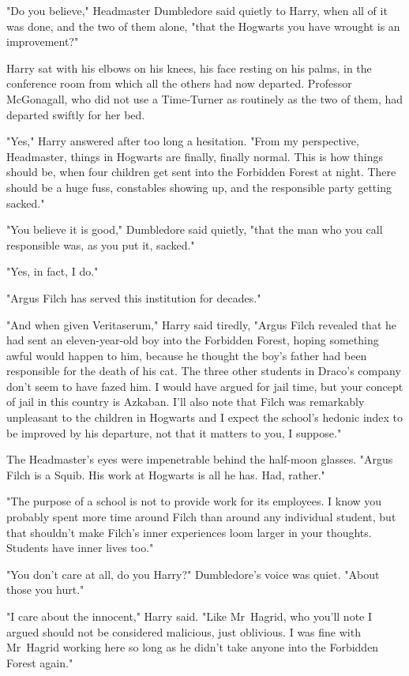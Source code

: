 "Do you believe," Headmaster Dumbledore said quietly to Harry, when all of it
was done, and the two of them alone, "that the Hogwarts you have wrought is an
improvement?"

Harry sat with his elbows on his knees, his face resting on his palms, in the
conference room from which all the others had now departed. Professor
McGonagall, who did not use a Time-Turner as routinely as the two of them, had
departed swiftly for her bed.

"Yes," Harry answered after too long a hesitation. "From my perspective,
Headmaster, things in Hogwarts are finally, finally normal. This is how things
should be, when four children get sent into the Forbidden Forest at night.
There should be a huge fuss, constables showing up, and the responsible party
getting sacked."

"You believe it is good," Dumbledore said quietly, "that the man who you call
responsible was, as you put it, sacked."

"Yes, in fact, I do."

"Argus Filch has served this institution for decades."

"And when given Veritaserum," Harry said tiredly, "Argus Filch revealed that he
had sent an eleven-year-old boy into the Forbidden Forest, hoping something
awful would happen to him, because he thought the boy's father had been
responsible for the death of his cat. The three other students in Draco's
company don't seem to have fazed him. I would have argued for jail time, but
your concept of jail in this country is Azkaban. I'll also note that Filch was
remarkably unpleasant to the children in Hogwarts and I expect the school's
hedonic index to be improved by his departure, not that it matters to you, I
suppose."

The Headmaster's eyes were impenetrable behind the half-moon glasses. "Argus
Filch is a Squib. His work at Hogwarts is all he has. Had, rather."

"The purpose of a school is not to provide work for its employees. I know you
probably spent more time around Filch than around any individual student, but
that shouldn't make Filch's inner experiences loom larger in your thoughts.
Students have inner lives too."

"You don't care at all, do you Harry?" Dumbledore's voice was quiet. "About
those you hurt."

"I care about the innocent," Harry said. "Like Mr~Hagrid, who you'll note I
argued should not be considered malicious, just oblivious. I was fine with
Mr~Hagrid working here so long as he didn't take anyone into the Forbidden
Forest again."

